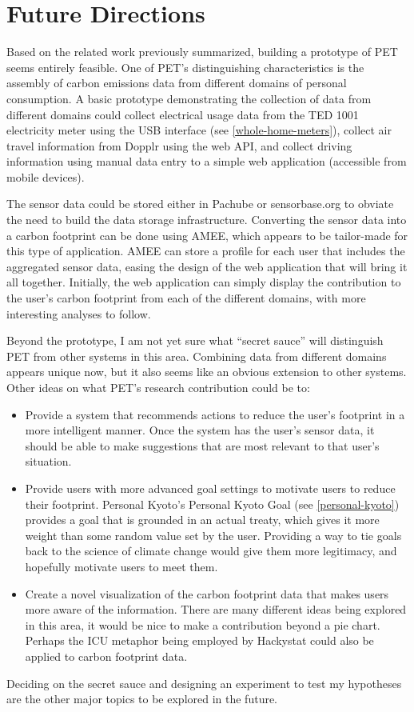 \chapter{Future Directions}

Based on the related work previously summarized, building a prototype of PET seems entirely feasible. One of PET's distinguishing characteristics is the assembly of carbon emissions data from different domains of personal consumption. A basic prototype demonstrating the collection of data from different domains could collect electrical usage data from the TED 1001 electricity meter using the USB interface (see \autoref{whole-home-meters}), collect air travel information from Dopplr using the web API, and collect driving information using manual data entry to a simple web application (accessible from mobile devices).

The sensor data could be stored either in Pachube or sensorbase.org to obviate the need to build the data storage infrastructure. Converting the sensor data into a carbon footprint can be done using AMEE, which appears to be tailor-made for this type of application. AMEE can store a profile for each user that includes the aggregated sensor data, easing the design of the web application that will bring it all together. Initially, the web application can simply display the contribution to the user's carbon footprint from each of the different domains, with more interesting analyses to follow.

Beyond the prototype, I am not yet sure what ``secret sauce'' will distinguish PET from other systems in this area. Combining data from different domains appears unique now, but it also seems like an obvious extension to other systems. Other ideas on what PET's research contribution could be to:

\begin{itemize}
	\item Provide a system that recommends actions to reduce the user's footprint in a more intelligent manner. Once the system has the user's sensor data, it should be able to make suggestions that are most relevant to that user's situation.
	\item Provide users with more advanced goal settings to motivate users to reduce their footprint. Personal Kyoto's Personal Kyoto Goal (see \autoref{personal-kyoto}) provides a goal that is grounded in an actual treaty, which gives it more weight than some random value set by the user. Providing a way to tie goals back to the science of climate change would give them more legitimacy, and hopefully motivate users to meet them.
	\item Create a novel visualization of the carbon footprint data that makes users more aware of the information. There are many different ideas being explored in this area, it would be nice to make a contribution beyond a pie chart. Perhaps the ICU metaphor being employed by Hackystat could also be applied to carbon footprint data.
\end{itemize}

Deciding on the secret sauce and designing an experiment to test my hypotheses are the other major topics to be explored in the future.